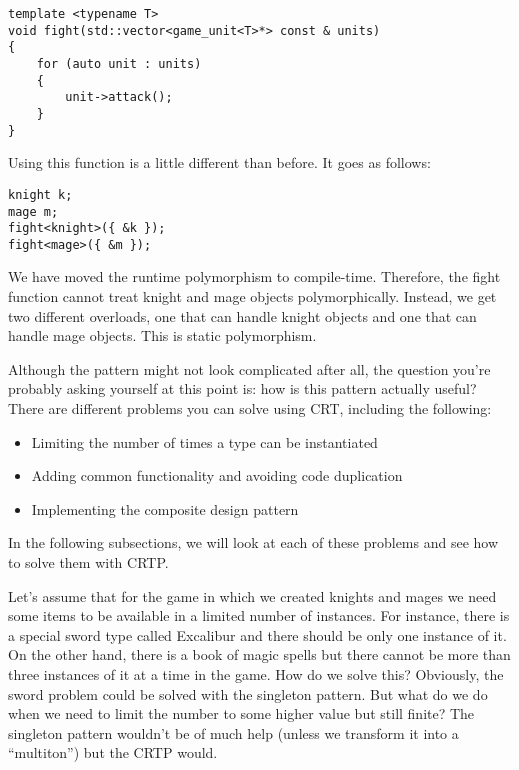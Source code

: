\begin{lstlisting}[style=styleCXX]
template <typename T>
void fight(std::vector<game_unit<T>*> const & units)
{
	for (auto unit : units)
	{
		unit->attack();
	}
}
\end{lstlisting}

Using this function is a little different than before. It goes as follows:

\begin{lstlisting}[style=styleCXX]
knight k;
mage m;
fight<knight>({ &k });
fight<mage>({ &m });
\end{lstlisting}

We have moved the runtime polymorphism to compile-time. Therefore, the fight function cannot treat knight and mage objects polymorphically. Instead, we get two different overloads, one that can handle knight objects and one that can handle mage objects. This is static polymorphism.

Although the pattern might not look complicated after all, the question you’re probably asking yourself at this point is: how is this pattern actually useful? There are different problems you can solve using CRT, including the following:

\begin{itemize}
\item
Limiting the number of times a type can be instantiated

\item
Adding common functionality and avoiding code duplication

\item
Implementing the composite design pattern
\end{itemize}

In the following subsections, we will look at each of these problems and see how to solve them with CRTP.


Let’s assume that for the game in which we created knights and mages we need some items to be available in a limited number of instances. For instance, there is a special sword type called Excalibur and there should be only one instance of it. On the other hand, there is a book of magic spells but there cannot be more than three instances of it at a time in the game. How do we solve this? Obviously, the sword problem could be solved with the singleton pattern. But what do we do when we need to limit the number to some higher value but still finite? The singleton pattern wouldn’t be of much help (unless we transform it into a “multiton”) but the CRTP would.

